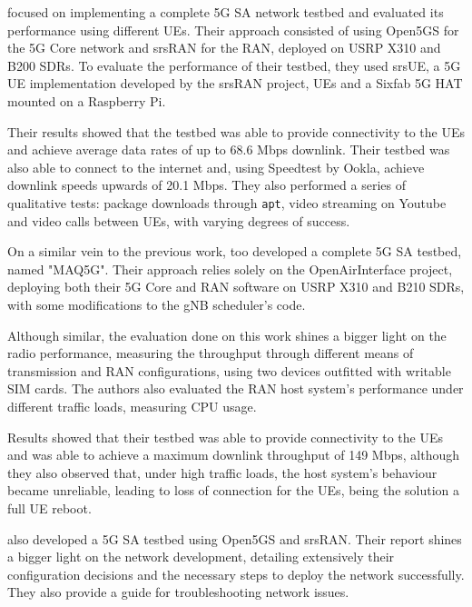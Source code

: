\textcite{tio2025exploring5g} focused on implementing a complete 5G \gls{SA} network testbed and evaluated its performance using different \glspl{UE}. Their approach consisted of using Open5GS for the 5G Core network and srsRAN for the \gls{RAN}, deployed on USRP X310 and B200 \glspl{SDR}. To evaluate the performance of their testbed, they used srsUE, a 5G \gls{UE} implementation developed by the srsRAN project,  \glspl{UE} and a Sixfab 5G HAT mounted on a Raspberry Pi.

Their results showed that the testbed was able to provide connectivity to the \glspl{UE} and achieve average data rates of up to 68.6 Mbps downlink. Their testbed was also able to connect to the internet and, using Speedtest by Ookla, achieve downlink speeds upwards of 20.1 Mbps. They also performed a series of qualitative tests: package downloads through \texttt{apt}, video streaming on Youtube and video calls between \glspl{UE}, with varying degrees of success.\bigskip

On a similar vein to the previous work, \textcite{vazquez2024maq5g} too developed a complete 5G \gls{SA} testbed, named "MAQ5G". Their approach relies solely on the OpenAirInterface project, deploying both their 5G Core and \gls{RAN} software on USRP X310 and B210 \glspl{SDR}, with some modifications to the \gls{gNB} scheduler's code.

Although similar, the evaluation done on this work shines a bigger light on the radio performance, measuring the throughput through different means of transmission and \gls{RAN} configurations, using two  devices outfitted with writable SIM cards. The authors also evaluated the \gls{RAN} host system's performance under different traffic loads, measuring CPU usage.

Results showed that their testbed was able to provide connectivity to the \glspl{UE} and was able to achieve a maximum downlink throughput of 149 Mbps, although they also observed that, under high traffic loads, the host system's behaviour became unreliable, leading to loss of connection for the \glspl{UE}, being the solution a full \gls{UE} reboot.\bigskip

\textcite{mamushiane2023deploying} also developed a 5G \gls{SA} testbed using Open5GS and srsRAN. Their report shines a bigger light on the network development, detailing extensively their configuration decisions and the necessary steps to deploy the network successfully. They also provide a guide for troubleshooting network issues.

